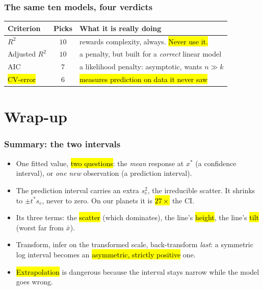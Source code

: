 \documentclass[slidestop,compress,mathserif]{beamer}
\begin{document}
\begin{frame}
\frametitle{The same ten models, four verdicts}

{\small
\begin{center}
\setlength{\tabcolsep}{4pt}
\begin{tabular}{@{}lcl@{}}
\toprule
\textbf{Criterion} & \textbf{Picks} & \textbf{What it is really doing} \\
\midrule
$R^2$ & $10$ & rewards complexity, always. \hl{Never use it.} \\
Adjusted $R^2$ & $10$ & a penalty, but built for a \emph{correct} linear model \\
AIC & $7$ & a likelihood penalty: asymptotic, wants $n \gg k$ \\
\hl{CV-error} & $6$ & \hl{measures prediction on data it never saw} \\
\bottomrule
\end{tabular}
\end{center}}

\pause
\vspace{0.2em}

\end{frame}


\section{Wrap-up}
\begin{frame}
\frametitle{Summary: the two intervals}

\begin{itemize}
\item One fitted value, \hl{two questions}: the \emph{mean} response at $x^\ast$ (a confidence interval), or \emph{one new} observation (a prediction interval).
\item The prediction interval carries an extra $s_e^2$, the irreducible scatter. It shrinks to $\pm t^\ast s_e$, never to zero. On our planets it is \hl{$27\times$} the CI.
\item Its three terms: the \hl{scatter} (which dominates), the line's \hl{height}, the line's \hl{tilt} (worst far from $\bar x$).
\item Transform, infer on the transformed scale, back-transform \emph{last}: a symmetric log interval becomes an \hl{asymmetric, strictly positive} one.
\item \hl{Extrapolation} is dangerous because the interval stays narrow while the model goes wrong.
\end{itemize}

\end{frame}
\end{document}
